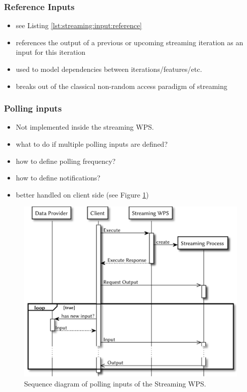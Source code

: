 		\subsubsection{Reference Inputs}\label{sec:stream:input:reference}
			\begin{itemize}
				\item see Listing \ref{lst:streaming:input:reference}
				\item references the output of a previous or upcoming streaming iteration as an input for this iteration
				\item used to model dependencies between iterations/features/etc.
				\item breaks out of the classical non-random access paradigm of streaming
			\end{itemize}
		\subsubsection{Polling inputs}
			\begin{itemize}
				\item Not implemented inside the streaming WPS.
				\item what to do if multiple polling inputs are defined?
				\item how to define polling frequency?
				\item how to define notifications?
				\item better handled on client side (see Figure \ref{fig:sd:polling})
			\end{itemize}
			\begin{figure}[!htb]
				\centering
				\includegraphics[width=.7868\textwidth]{figures/sequence-diagramm-polling.pdf}
				\caption{\label{fig:sd:polling} Sequence diagram of polling inputs of the Streaming WPS.}
			\end{figure}
